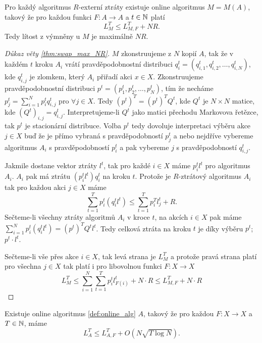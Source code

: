 \begin{theorem}\label{thm:swap_max_NR}
Pro každý algoritmus $R$-externí ztráty existuje online algoritmus $M=M(A)$, takový že pro každou funkci $F: A \rightarrow A$ a $t \in \mathbb{N}$ platí 
\[
    L^T_M \leq L^T_{M,F} + NR.
\]
Tedy lítost z výmněny u $M$ je maximálně $NR$. 
\end{theorem}
\begin{proof}[Důkaz věty \ref{thm:swap_max_NR}]
    $M$ zkonstruujeme z $N$ kopií $A$, tak že v každém $t$ kroku $A_i$ vrátí pravděpodobnostní distribuci $q_i^t = (q^t_{i,1}, q^t_{i,2}, \dots, q^t_{i,N})$, kde $q^t_{i,j}$ je zlomkem, který $A_i$ přiřadí akci $x \in X$. 
    Zkonstruujeme pravděpodobnostní distribuci $p^t = (p^t_1, p^t_2, \dots, p^t_N)$, tím že necháme $p^t_j = \sum^N_{i=1} p^t_i q^t_{i,j}$ pro $\forall j \in X$. 
    Tedy $(p^t)^T = (p^t)^T Q^t$, kde $Q^t$ je $N\times N$ matice, kde $(Q^t)_{i,j} = q^t_{i,j}$. 
    Interpretujeme-li $Q^t$ jako matici přechodu Markovova řetězce, tak $p^t$ je stacionární distribuce. 
    Volba $p^t$ tedy dovoluje interpretaci výběru akce $j\in X$ buď že je přímo vybraná s pravděpodobností $p^t_j$ a nebo nejdříve vybereme algoritmus $A_i$ s pravděpodobností $p^t_i$ a pak vybereme $j$ s pravděpodobností $q^t_{i,j}$. 

    Jakmile dostane vektor ztráty $l^t$, tak pro každé $i \in X$ máme $p_i^tl^t$ pro algoritmus $A_i$. 
    $A_i$ pak má ztrátu $(p^t_i l^t)q^t_i$ na kroku $t$. 
    Protože je $R$-ztrátový algoritmus $A_i$ tak pro každou akci $j \in X$ máme
    \[
        \sum^T_{t=1} p_i^t (q_i^t l^t) \leq \sum_{t=1}^T p_i^T l_j^t + R.
    \]
    Sečteme-li všechny ztráty algoritmů $A_i$ v kroce $t$, na akcích $i \in X$ pak máme $\sum^N_{i=1} p_i^t(q_i^t l^t) = (p^t)^T Q^t l^t$. 
    Tedy celková ztráta na kroku $t$ je díky výběru $p^t$; $p^t \cdot l^t$. 

    Sečteme-li vše přes akce $i \in X$, tak levá strana je $L^T_M$ a protože pravá strana platí pro všechna $j \in X$ tak platí i pro libovolnou funkci $F: X\rightarrow X$
    \[
        L_M^T \leq \sum^N_{i=1} \sum^T_{t=1} p_i^t l^t_{F(i)} + N\cdot R \leq L^T_{M,F} + N\cdot R 
    \]
\end{proof}
\begin{theorem}
\label{thm:swap_poly}
Existuje online algoritmus \ref{def:online_alg} $A$, takový že pro každou $F: X \rightarrow X$ a $T \in \mathbb{N}$, máme 
\[
    L^T_A \leq L^T_{A,F} + O(N \sqrt{T\log N}). 
\]
\end{theorem}


